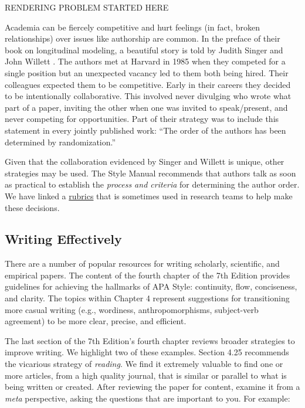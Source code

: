 \documentclass[
  11pt,
]{book}
\begin{document}
RENDERING PROBLEM STARTED HERE

Academia can be fiercely competitive and hurt feelings (in fact, broken relationships) over issues like authorship are common. In the preface of their book on longitudinal modeling, a beautiful story is told by Judith Singer and John Willett \citeyearpar{singer_applied_2003}. The authors met at Harvard in 1985 when they competed for a single position but an unexpected vacancy led to them both being hired. Their colleagues expected them to be competitive. Early in their careers they decided to be intentionally collaborative. This involved never divulging who wrote what part of a paper, inviting the other when one was invited to speak/present, and never competing for opportunities. Part of their strategy was to include this statement in every jointly published work: ``The order of the authors has been determined by randomization.''

Given that the collaboration evidenced by Singer and Willett \citeyearpar{singer_applied_2003} is unique, other strategies may be used. The Style Manual recommends that authors talk as soon as practical to establish the \emph{process and criteria} for determining the author order. We have linked a \href{https://github.com/lhbikos/TransformingResearchMethods/blob/main/Authorship\%20Rubric220721.xlsx}{rubrics} that is sometimes used in research teams to help make these decisions.

\subsection{Writing Effectively}\label{writing-effectively}

There are a number of popular resources for writing scholarly, scientific, and empirical papers. The content of the fourth chapter of the 7th Edition provides guidelines for achieving the hallmarks of APA Style: continuity, flow, conciseness, and clarity. The topics within Chapter 4 represent suggestions for transitioning more casual writing (e.g., wordiness, anthropomorphisms, subject-verb agreement) to be more clear, precise, and efficient.

The last section of the 7th Edition's fourth chapter reviews broader strategies to improve writing. We highlight two of these examples. Section 4.25 recommends the vicarious strategy of \emph{reading}. We find it extremely valuable to find one or more articles, from a high quality journal, that is similar or parallel to what is being written or created. After reviewing the paper for content, examine it from a \emph{meta} perspective, asking the questions that are important to you. For example:
\end{document}
